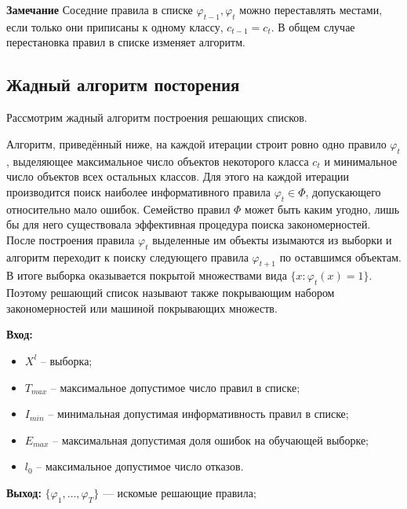 \textbf{Замечание} Соседние правила в списке $\varphi_{t-1}, \varphi_t$ можно переставлять местами,
если только они приписаны к одному классу, $c_{t-1} = c_t$. В общем случае перестановка
правил в списке изменяет алгоритм.

\subsection{Жадный алгоритм посторения}
Рассмотрим жадный алгоритм построения решающих списков.

Алгоритм, приведённый ниже, на каждой итерации строит ровно одно правило $\varphi_t$, выделяющее максимальное число объектов некоторого класса $c_t$ и минимальное число объектов
всех остальных классов. Для этого на каждой итерации производится поиск наиболее информативного правила $\varphi_t \in \Phi$, допускающего относительно мало ошибок. Семейство
правил $\Phi$ может быть каким угодно, лишь бы для него существовала эффективная
процедура поиска закономерностей. После построения правила $\varphi_t$ выделенные им объекты изымаются из выборки и алгоритм переходит к поиску следующего правила $\varphi_{t+1}$ по оставшимся объектам. В итоге выборка оказывается покрытой
множествами вида $\{x: \varphi_t(x) = 1\}$. Поэтому решающий список называют также покрывающим набором закономерностей или машиной покрывающих множеств.

\hline
\textbf{Вход:}
\begin{itemize}
    \item $X^l$ -- выборка;
    \item $T_{max}$ -- максимальное допустимое число правил в списке;
    \item $I_{min}$ -- минимальная допустимая информативность правил в списке;
    \item $E_{max}$ -- максимальная допустимая доля ошибок на обучающей выборке;
    \item $l_0$ -- максимальное допустимое число отказов.
\end{itemize}

\textbf{Выход:}
 $\{\varphi_1, \dots, \varphi_T\} \text{ — искомые решающие правила;}$


